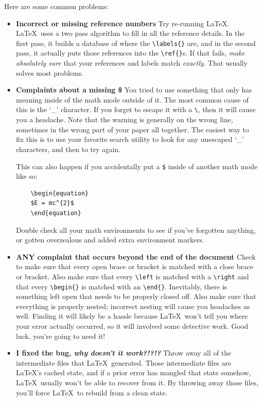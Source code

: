 \documentclass[letterpaper]{article}
\begin{document}
Here are some common problems:

\begin{itemize}

\item \textbf{Incorrect or missing reference numbers} Try re-running 
\LaTeX.  \LaTeX\ uses a two pass algorithm to fill in all the reference 
details.  In the first pass, it builds a database of where the 
\verb+\labels{}+ are, and in the second pass, it actually puts those 
references into the \verb+\ref{}+s.  If that fails, \emph{make 
absolutely sure} that your references and labels match \emph{exactly}.  
That usually solves most problems.

\item \textbf{Complaints about a missing \$} You tried to use something 
that only has meaning inside of the math mode outside of it.  The most 
common cause of this is the `\_' character.  If you forget to escape it 
with a \verb+\+, then it will cause you a headache.  Note that the 
warning is generally on the wrong line, sometimes in the wrong part of 
your paper all together.  The easiest way to fix this is to use your 
favorite search utility to look for any unescaped `\_' characters, and 
then to try again.

This can also happen if you accidentally put a \verb+$+ inside of another 
math mode like so:

\begin{verbatim}
    \begin{equation}
    $E = mc^{2}$
    \end{equation}
\end{verbatim}

Double check all your math environments to see if you've forgotten anything,
or gotten overzealous and added extra environment markers.

\item \textbf{ANY complaint that occurs beyond the end of the document} 
Check to make sure that every open brace or bracket is matched with a 
close brace or bracket. Also make sure that every \verb+\left+ is 
matched with a \verb+\right+ and that every \verb+\begin{}+ is matched 
with an \verb+\end{}+.  Inevitably, there is something left open that 
needs to be properly closed off. Also make sure that everything is 
properly nested; incorrect nesting will cause you headaches as well. 
Finding it will likely be a hassle because \LaTeX\ won't tell you where 
your error actually occurred, so it will involved some detective work.  
Good luck, you're going to need it!

\item \textbf{I fixed the bug, \emph{why doesn't it work?!?!?}} Throw 
away all of the intermediate files that \LaTeX\ generated.  Those 
intermediate files are \LaTeX's cached state, and if a prior error has 
mangled that state somehow, \LaTeX\ usually won't be able to recover 
from it.  By throwing away those files, you'll force \LaTeX\ to rebuild 
from a clean state.

\end{itemize}
\end{document}
